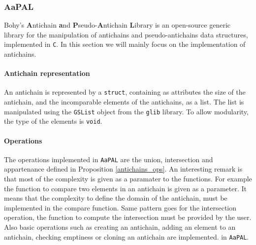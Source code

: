 \documentclass[letterpaper]{article}
\theoremstyle{definition}
\begin{document}

\subsubsection{AaPAL}


Bohy's \textbf{A}ntichain
\textbf{a}nd \textbf{P}seudo-\textbf{A}ntichain \textbf{L}ibrary \cite{aapal}
is an open-source generic library for the manipulation
of antichains and pseudo-antichains data structures,
implemented in \texttt{C}. In this section we will mainly focus
on the implementation of antichains.


\paragraph{Antichain representation}

An antichain is represented by a \texttt{struct}, containing as attributes
the size of the antichain, and the incomparable elements of the antichains,
as a list. The list is manipulated using the \texttt{GSList} object
from the \texttt{glib} library.
To allow modularity, the type of the elements
is \texttt{void}.

\paragraph{Operations}

The operations implemented in \texttt{AaPAL}
are the union, intersection and appartenance
defined in Proposition \ref{antichains_ops}.
An interesting remark is that most of the complexity is given as a paramater
to the functions. For example the function to compare two elements in
an antichain is given as a parameter. It means that the complexity to define
the domain of the antichain, must be implemented in the compare function.
Same pattern goes for the intersection operation,
the function to compute the intersection must be provided by the user.
Also basic
operations such as creating an antichain,
adding an element to
an antichain, checking emptiness or cloning an antichain are implemented.
in \texttt{AaPAL}.
\end{document}
